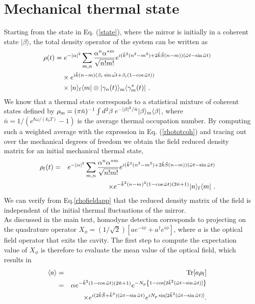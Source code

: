 \documentclass[aps,twocolumn,preprintnumbers,amsmath,amssymb]{revtex4}
\newcommand{\Tr}{\mathrm{Tr}}
\begin{document}
\noindent
\section{\label{Homodyne detection} Mechanical thermal state}
Starting from the state in Eq. (\ref{state}), where the mirror is initially in a coherent state $|\beta\rangle$, the total density operator of the system can be written as
\begin{equation}\begin{split}\label{rhototcoh}
\rho(t)=&\;e^{-|\alpha|^2}\sum_{m,n}\frac{\alpha^n\alpha^{*m}}{\sqrt{n!m!}}e^{i(\tilde{k}^2(n^2-m^2)+2\tilde{k}\tilde{S}(n-m))(\tilde{\omega} t-\sin\tilde{\omega} t)}\\
&\times e^{i\tilde{k}(n-m)(\beta_r\sin\tilde{\omega t}+\beta_i(1-\cos\tilde{\omega} t))}\\
&\times |n\rangle_{\rm f}\langle m|\otimes|\gamma_n(t)\rangle_{\rm m}\langle\gamma^*_m(t)|\ .
\end{split}\end{equation}
We know that a thermal state corresponds to a statistical mixture of coherent states defined by $\rho_{\rm m}=(\pi \bar{n})^{-1}\int d^2\beta\; e^{-|\beta|^2/\bar{n}}|\beta\rangle_{\rm m}\langle\beta|$, where $\bar{n}=1/(e^{\hbar\omega/(k_bT)}-1)$ is the average thermal occupation number. By computing such a weighted average with the expression in Eq. (\ref{rhototcoh}) and tracing out over the mechanical degrees of freedom we obtain the field reduced density matrix for an initial mechanical thermal state,
\begin{eqnarray}\label{rhofieldapp}
\rho_{\rm f}(t)&=&e^{-|\alpha|^2}\sum_{m,n}\frac{\alpha^n\alpha^{*m}}{\sqrt{n!m!}}e^{i(\tilde{k}^2(n^2-m^2)+2\tilde{k}\tilde{S}(n-m))(\tilde{\omega} t-\sin\tilde{\omega} t)}\nonumber \\
&&\times e^{-\tilde{k}^2(n-m)^2(1-\cos\tilde{\omega} t)(2\bar{n}+1)}|n\rangle_{\rm f}\langle m|\ .
\end{eqnarray}
We can verify from Eq.\eqref{rhofieldapp} that the reduced density matrix of the field is independent of the initial thermal fluctuations of the mirror.\\
As discussed in the main text, homodyne detection corresponds to projecting on the quadrature operator $X_{\phi}=(1/\sqrt{2})[ae^{-i\phi}+a^{\dag}e^{i\phi}]$, where $a$ is the optical field operator that exits the cavity. The first step to compute the expectation value of $X_{\phi}$ is therefore to evaluate the mean value of the optical field, which results in
\begin{eqnarray}\label{optical-field}
\langle a\rangle&=&\Tr[a\rho_{\rm f}]\nonumber \\
&=&\alpha e^{-\tilde{k}^2(1-\cos\tilde{\omega} t)(2\bar{n}+1)}e^{-N_p\left\lbrace 1-\cos[2\tilde{k}^2(\tilde{\omega}t-\sin\tilde{\omega}t)]\right\rbrace}\nonumber \\
&&\times e^{i(2\tilde{k}\tilde{S}+\tilde{k}^2)(\tilde{\omega}t-\sin\tilde{\omega}t)}e^{iN_p\sin[2\tilde{k}^2(\tilde{\omega}t-\sin\tilde{\omega}t)]}.
\end{eqnarray}
\end{document}
